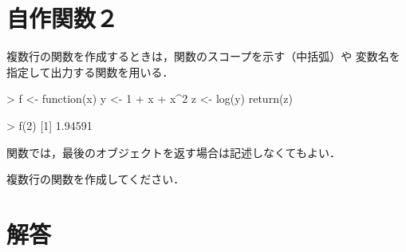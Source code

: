\documentclass[../main]{subfiles}
\begin{document}
\section{自作関数２}

{
  複数行の関数を作成するときは，関数のスコープを示す（中括弧）や
  変数名を指定して出力する関数を用いる．
}

\begin{ConsoleR}
> f <- function(x) {
      y <- 1 + x + x^2
      z <- log(y)
      return(z)
      }

> f(2)
[1] 1.94591
\end{ConsoleR}

関数では，最後のオブジェクトを返す場合は記述しなくてもよい．

\begin{exercise}
  複数行の関数を作成してください．
  \tcblower
\end{exercise}

\tcbstoprecording
\section{解答}
\tcbinputrecords
\end{document}
